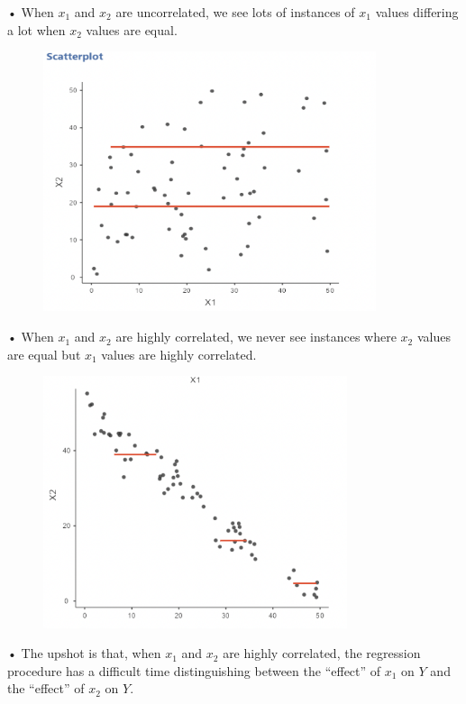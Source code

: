 \documentclass[
  letterpaper,
  DIV=11,
  numbers=noendperiod]{scrreprt}
\begin{document}
• When \(x_1\) and \(x_2\) are uncorrelated, we see lots of instances of
\(x_1\) values differing a lot when \(x_2\) values are equal.

\begin{figure}

{\centering \includegraphics[width=3.84375in,height=\textheight]{images/mod4_pt1_22.0.png}

}

\end{figure}

• When \(x_1\) and \(x_2\) are highly correlated, we never see instances
where \(x_2\) values are equal but \(x_1\) values are highly correlated.

\begin{figure}

{\centering \includegraphics[width=3.51042in,height=\textheight]{images/mod4_pt1_22.5.png}

}

\end{figure}

• The upshot is that, when \(x_1\) and \(x_2\) are highly correlated,
the regression procedure has a difficult time distinguishing between the
``effect'' of \(x_1\) on \(Y\) and the ``effect'' of \(x_2\) on \(Y\).
\end{document}
